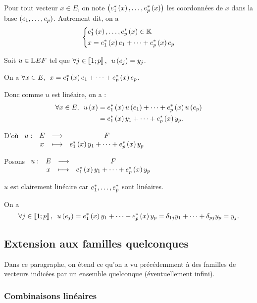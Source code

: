\begin{dem}
Pour tout vecteur \(x\in E\), on note \(\left(e_1^{*}\left(x\right),\dots,e_p^{*}\left(x\right)\right)\) les coordonnées de \(x\) dans la base \(\left(e_1,\dots,e_p\right)\). Autrement dit, on a \[\begin{dcases}
e_1^{*}\left(x\right),\dots,e_p^{*}\left(x\right)\in\mathbb{K} \\
x=e_1^{*}\left(x\right)e_1+\dots+e_p^{*}\left(x\right)e_p
\end{dcases}\]

\analyse

Soit \(u\in\mathbb{L}{E}{F}\) tel que \(\quantifs{\forall j\in\interventierii{1}{p}}u\paren{e_j}=y_j\).

On a \(\quantifs{\forall x\in E}x=e_1\etoile\paren{x}e_1+\dots+e_p\etoile\paren{x}e_p\).

Donc comme \(u\) est linéaire, on a : \[\begin{aligned}
\quantifs{\forall x\in E}u\paren{x}&=e_1\etoile\paren{x}u\paren{e_1}+\dots+e_p\etoile\paren{x}u\paren{e_p} \\
&=e_1\etoile\paren{x}y_1+\dots+e_p\etoile\paren{x}y_p.
\end{aligned}\]

D'où \(\begin{array}[t]{cccc}u : & E & \longrightarrow & F \\ & x & \longmapsto & e_1^{*}\left(x\right)y_1+\dots+e_p^{*}\left(x\right)y_p\end{array}\)

\synthese

Posons \(\begin{array}[t]{cccc}u : & E & \longrightarrow & F \\ & x & \longmapsto & e_1^{*}\left(x\right)y_1+\dots+e_p^{*}\left(x\right)y_p\end{array}\)

\(u\) est clairement linéaire car \(e_1^{*},\dots,e_p^{*}\) sont linéaires.

On a \[\quantifs{\forall j\in\interventierii{1}{p}}u\paren{e_j}=e_1\etoile\paren{x}y_1+\dots+e_p\etoile\paren{x}y_p=\delta_{1j}y_1+\dots+\delta_{pj}y_p=y_j.\]
\end{dem}

\subsection{Extension aux familles quelconques}

Dans ce paragraphe, on étend ce qu'on a vu précédemment à des familles de vecteurs indicées par un ensemble quelconque (éventuellement infini).

\subsubsection{Combinaisons linéaires}

